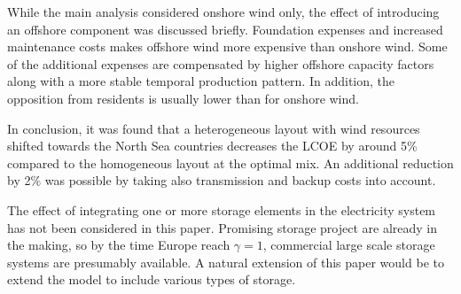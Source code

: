\documentclass[a4paper, 12pt, sort&compress]{elsarticle}%
\begin{document}
While the main analysis considered onshore wind only, the effect of
introducing an offshore component was discussed briefly. Foundation
expenses and increased maintenance costs makes offshore wind more
expensive than onshore wind. Some of the additional expenses are
compensated by higher offshore capacity factors along with a more
stable temporal production pattern. In addition, the opposition from
residents is usually lower than for onshore wind.

In conclusion, it was found that a heterogeneous layout with wind
resources shifted towards the North Sea countries decreases the LCOE
by around 5\% compared to the homogeneous layout at the optimal mix. An
additional reduction by 2\% was possible by taking also transmission
and backup costs into account. \newline

The effect of integrating one or more storage elements in the
electricity system has not been considered in this paper. Promising
storage project are already in the making, so by the time Europe reach
$\gamma = 1$, commercial large scale storage systems are presumably
available. A natural extension of this paper would be to extend the
model to include various types of storage.




\end{document}
